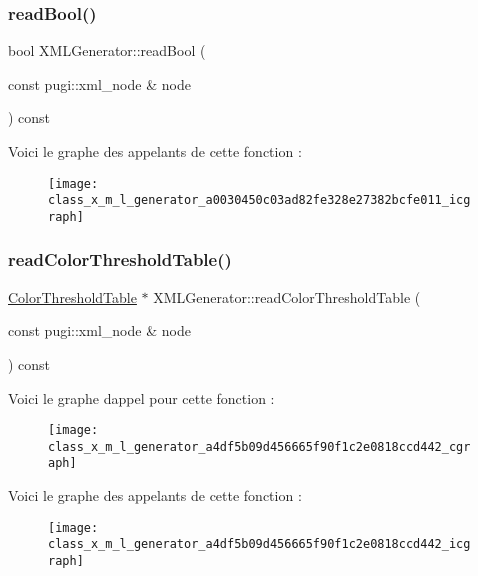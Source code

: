 \subsubsection{\texorpdfstring{read\+Bool()}{readBool()}}
{\footnotesize\ttfamily bool X\+M\+L\+Generator\+::read\+Bool (\begin{DoxyParamCaption}\item[{const pugi\+::xml\+\_\+node \&}]{node }\end{DoxyParamCaption}) const\hspace{0.3cm}{\ttfamily [private]}}

Voici le graphe des appelants de cette fonction \+:
\nopagebreak
\begin{figure}[H]
\begin{center}
\leavevmode
\texttt{[image: class\_x\_m\_l\_generator\_a0030450c03ad82fe328e27382bcfe011\_icgraph]}
\end{center}
\end{figure}
\mbox{\label{class_x_m_l_generator_a4df5b09d456665f90f1c2e0818ccd442}} 
\subsubsection{\texorpdfstring{read\+Color\+Threshold\+Table()}{readColorThresholdTable()}}
{\footnotesize\ttfamily \hyperlink{thresholdtable_8h_ab0deb49d07758f9814993774cb9935cc}{Color\+Threshold\+Table} $\ast$ X\+M\+L\+Generator\+::read\+Color\+Threshold\+Table (\begin{DoxyParamCaption}\item[{const pugi\+::xml\+\_\+node \&}]{node }\end{DoxyParamCaption}) const\hspace{0.3cm}{\ttfamily [private]}}

Voici le graphe d\textquotesingle{}appel pour cette fonction \+:
\nopagebreak
\begin{figure}[H]
\begin{center}
\leavevmode
\texttt{[image: class\_x\_m\_l\_generator\_a4df5b09d456665f90f1c2e0818ccd442\_cgraph]}
\end{center}
\end{figure}
Voici le graphe des appelants de cette fonction \+:
\nopagebreak
\begin{figure}[H]
\begin{center}
\leavevmode
\texttt{[image: class\_x\_m\_l\_generator\_a4df5b09d456665f90f1c2e0818ccd442\_icgraph]}
\end{center}
\end{figure}
\mbox{\label{class_x_m_l_generator_ab0a3198e6d44dcf102e13902325e0bd1}} 
